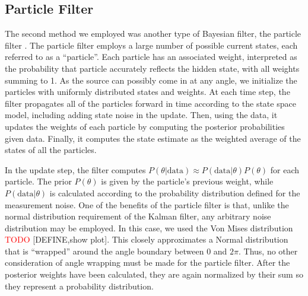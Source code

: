 \documentclass[11pt]{amsart}
\begin{document}

\subsection{Particle Filter}
The second method we employed was another type of Bayesian filter, the particle filter \cite{Particle}. The particle filter employs a large number of possible current states, each referred to 
as a “particle”. Each particle has an associated weight, interpreted as the probability that particle accurately reflects the hidden state, with all weights summing to 1. As the source can possibly 
come in at any angle, we initialize the particles with uniformly distributed states and weights. At each time step, the filter propagates all of the particles forward in time according to the state space 
model, including adding state noise in the update. Then, using the data, it updates the weights of each particle by computing the posterior probabilities given data. Finally, it computes the state estimate 
as the weighted average of the states of all the particles. 

In the update step, the filter computes $P(\theta|\text{data}) \approx P(\text{data}|\theta)P(\theta)$ for each particle. The prior $P(\theta)$ is given by the particle’s previous weight, while $P(\text{data}|\theta)$ is calculated 
according to the probability distribution defined for the measurement noise. One of the benefits of the particle filter is that, unlike the normal distribution requirement of the Kalman filter, any arbitrary noise 
distribution may be employed. In this case, we used the Von Mises distribution \textcolor{red}{TODO} [DEFINE,show plot]. This closely approximates a Normal distribution that is “wrapped” around the angle boundary between $0$ and $2\pi$. 
Thus, no other consideration of angle wrapping must be made for the particle filter. After the posterior weights have been calculated, they are again normalized by their sum so they represent a probability distribution.
\end{document}
